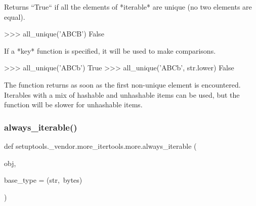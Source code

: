 \begin{DoxyVerb}Returns ``True`` if all the elements of *iterable* are unique (no two
elements are equal).

    >>> all_unique('ABCB')
    False

If a *key* function is specified, it will be used to make comparisons.

    >>> all_unique('ABCb')
    True
    >>> all_unique('ABCb', str.lower)
    False

The function returns as soon as the first non-unique element is
encountered. Iterables with a mix of hashable and unhashable items can
be used, but the function will be slower for unhashable items.
\end{DoxyVerb}
 \mbox{\label{namespacesetuptools_1_1__vendor_1_1more__itertools_1_1more_a83c94aeea028d3c3c84c578919dc9e0b}} 
\subsubsection{\texorpdfstring{always\+\_\+iterable()}{always\_iterable()}}
{\footnotesize\ttfamily def setuptools.\+\_\+vendor.\+more\+\_\+itertools.\+more.\+always\+\_\+iterable (\begin{DoxyParamCaption}\item[{}]{obj,  }\item[{}]{base\+\_\+type = {\ttfamily (str,~bytes)} }\end{DoxyParamCaption})}

